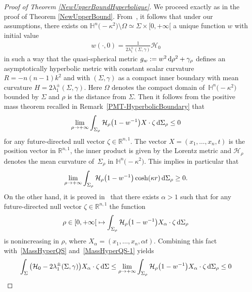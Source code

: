 \documentclass[10pt,a4paper]{amsart}
\numberwithin{equation}{section}
\begin{document}
\begin{proof}[Proof of Theorem \ref{NewUpperBoundHyperbolique}]
We proceed exactly as in the proof of Theorem \ref{NewUpperBound}. From~\cite{Kwong1,WangYau0}, it follows that under our assumptions, there exists on $\mathbb{H}^n\bigl(-\kappa^2\bigr)\setminus\Omega\simeq\Sigma\times[0,+\infty[{}$ a unique function $w$ with initial value
\begin{gather*}
w(\cdot,0)=\frac{1}{2\lambda^\pm_1(\Sigma,\gamma)}\mathcal{H}_0
\end{gather*}
in such a way that the quasi-spherical metric $g_w:=w^2\,{\rm d}\rho^2+\gamma_\rho$ defines an asymptotically hyperbolic metric with constant scalar curvature $R=-n(n-1)k^2$ and with $(\Sigma,\gamma)$ as a compact inner boundary with mean curvature  $H=2\lambda_1^\pm(\Sigma,\gamma)$. Here $\Omega$ denotes the compact domain of~$\mathbb{H}^n\bigl(-\kappa^2\bigr)$ bounded by $\Sigma$ and $\rho$ is the distance from $\Sigma$. Then it follows from the positive mass theorem recalled in Remark~\ref{PMT-HyperbolicBoundary} that
\begin{gather}\label{MassHyperQS}
\lim_{\rho\rightarrow+\infty}\int_{\Sigma_\rho}\mathcal{H}_{\rho}\big(1-w^{-1}\big) X\cdot\zeta\,{\rm d}\Sigma_\rho \leq 0
\end{gather}
for any future-directed null vector $\zeta\in\mathbb{R}^{n,1}$. The vector $X=(x_1,\dots,x_n,t)$ is the position vector in $\mathbb{R}^{n,1}$, the inner product is given by the Lorentz metric and $\mathcal{H}_\rho$ denotes the mean curvature of~$\Sigma_\rho$ in $\mathbb{H}^n\bigl(-\kappa^2\bigr)$. This implies in particular that
\begin{gather}\label{MassHyperQS-1}
\lim_{\rho\rightarrow+\infty}\int_{\Sigma_\rho}\mathcal{H}_{\rho}\big(1-w^{-1}\big) \cosh(\kappa r)\,{\rm d}\Sigma_\rho \geq 0.
\end{gather}
On the other hand, it is proved in~\cite{Kwong1,ShiTam2} that there exists $\alpha>1$ such that for any future-directed null vector $\zeta\in\mathbb{R}^{n,1}$ the function
\begin{gather*}%
\rho\in[0,+\infty[{}\mapsto \int_{\Sigma_\rho}\mathcal{H}_{\rho}\big(1-w^{-1}\big)X_\alpha\cdot\zeta\,{\rm d}\Sigma_\rho
\end{gather*}
is nonincreasing in $\rho$, where $X_\alpha=(x_1,\dots,x_n,\alpha t)$. Combining this fact with~\eqref{MassHyperQS} and~\eqref{MassHyperQS-1} yields
\begin{gather*}
\int_{\Sigma}\big(\mathcal{H}_{0}-2\lambda_1^\pm(\Sigma,\gamma)\big)X_\alpha\cdot\zeta\,{\rm d}\Sigma\leq\lim_{\rho\rightarrow+\infty}\int_{\Sigma_\rho}\mathcal{H}_{\rho}\big(1-w^{-1}\big) X_\alpha\cdot\zeta\,{\rm d}\Sigma_\rho \leq 0

\end{gather*}
\end{proof}
\end{document}
